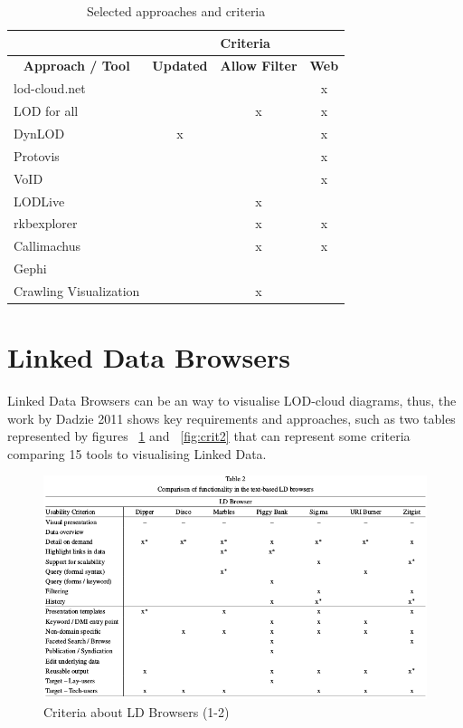 \documentclass{iosart2c}
\begin{document}
\begin{table}[htbp]
\caption{Selected approaches and criteria }
\begin{tabular}{|l|c|c|c|}
\hline
 & \multicolumn{ 3}{c|}{\textbf{Criteria}} \\ \hline
\multicolumn{1}{|c|}{\textbf{Approach / Tool}} & \textbf{Updated} & \textbf{Allow Filter} & \textbf{Web} \\ \hline
lod-cloud.net  &  &  & x \\ \hline
LOD for all &  & x & x \\ \hline
DynLOD & x &  & x \\ \hline
Protovis &  &  & x \\ \hline
VoID &  &  & x \\ \hline
LODLive &  & x &  \\ \hline
rkbexplorer &  & x & x \\ \hline
Callimachus &  & x & x \\ \hline
Gephi\\ Crawling Visualization &  & x &  \\ \hline
\end{tabular}
\label{Criteria}
\end{table}

\section{Linked Data Browsers}

Linked Data Browsers can be an way to visualise LOD-cloud diagrams, thus, the work by Dadzie 2011 \cite{Dadzie2011} shows key requirements and approaches, such as two tables represented by figures ~\ref{fig:crit1} and ~\ref{fig:crit2} that can represent some criteria comparing 15 tools to visualising Linked Data.

\begin{figure}[tbp] 
  \centering
\includegraphics[width=\textwidth]{img/table2.png}
  \caption{Criteria about LD Browsers (1-2) \cite{Dadzie2011}}
  \label{fig:crit1}
\end{figure}
\end{document}
